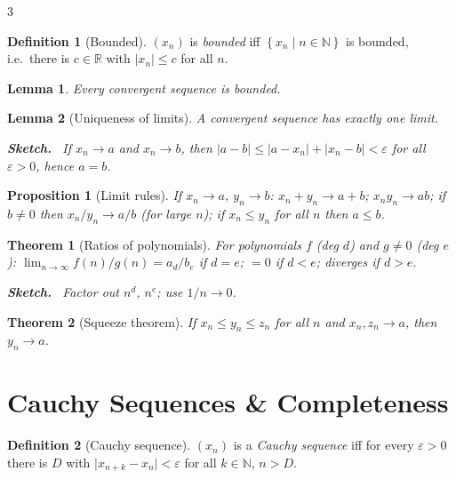 \documentclass[10pt,a4paper,landscape]{article}
\theoremstyle{definition}
\newtheorem{defn}{Definition}[section]
\theoremstyle{plain}
\newtheorem{thm}{Theorem}[section]
\newtheorem{lem}{Lemma}[section]
\newtheorem{prop}{Proposition}[section]
\theoremstyle{remark}
\newcommand{\R}{\mathbb{R}}
\newcommand{\N}{\mathbb{N}}
\newcommand{\eps}{\varepsilon}
\newcommand{\abs}[1]{\lvert #1 \rvert}
\newcommand{\set}[1]{\left\{ #1 \right\}}
\newcommand{\oo}{\infty}
\newenvironment{proofsketch}{%
  \par\small\color{exgray}\textbf{Sketch.}\ }%
  {\par}
\begin{document}
\begin{multicols*}{3}
\begin{defn}[Bounded]
$(x_n)$ is \emph{bounded} iff $\set{x_n \mid n \in \N}$ is bounded, i.e.\ there is $c \in \R$ with $\abs{x_n} \le c$ for all $n$.
\end{defn}

\begin{lem}
Every convergent sequence is bounded.
\end{lem}

\begin{lem}[Uniqueness of limits]
A convergent sequence has exactly one limit.
\begin{proofsketch}
If $x_n \to a$ and $x_n \to b$, then $\abs{a-b} \le \abs{a-x_n} + \abs{x_n-b} < \eps$ for all $\eps>0$, hence $a=b$.
\end{proofsketch}
\end{lem}

\begin{prop}[Limit rules]
If $x_n \to a$, $y_n \to b$: $x_n + y_n \to a+b$; $x_n y_n \to ab$; if $b \neq 0$ then $x_n/y_n \to a/b$ (for large $n$); if $x_n \le y_n$ for all $n$ then $a \le b$.
\end{prop}

\begin{thm}[Ratios of polynomials]
For polynomials $f$ (deg $d$) and $g \neq 0$ (deg $e$): $\lim_{n\to\oo} f(n)/g(n) = a_d/b_e$ if $d=e$; $=0$ if $d<e$; diverges if $d>e$.
\begin{proofsketch}
Factor out $n^d$, $n^e$; use $1/n \to 0$.
\end{proofsketch}
\end{thm}

\begin{thm}[Squeeze theorem]
If $x_n \le y_n \le z_n$ for all $n$ and $x_n, z_n \to a$, then $y_n \to a$.
\end{thm}

\section{Cauchy Sequences \& Completeness}

\begin{defn}[Cauchy sequence]
$(x_n)$ is a \emph{Cauchy sequence} iff for every $\eps>0$ there is $D$ with $\abs{x_{n+k} - x_n} < \eps$ for all $k \in \N$, $n > D$.
\end{defn}


\end{multicols*}
\end{document}
